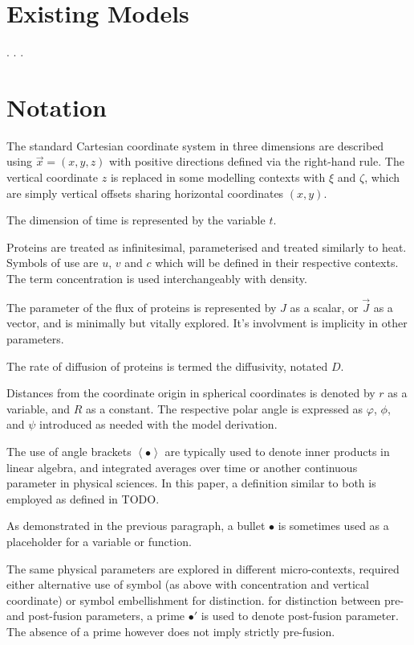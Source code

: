 \documentclass{report}
\newcommand\Angle[1]{{ \left\langle{#1}\right\rangle }}
\begin{document}
\section{Existing Models}
\cite{marrink2019computational}.
\cite{jorgensen2017computer}.
\cite{risselada2020proteins}.

\section{Notation}
The standard Cartesian coordinate system in three dimensions are described using $\vec{x} = (x, y, z)$ with positive directions defined via the right-hand rule. The vertical coordinate $z$ is replaced in some modelling contexts with $\xi$ and $\zeta$, which are simply vertical offsets sharing horizontal coordinates $(x, y)$.

The dimension of time is represented by the variable $t$.

Proteins are treated as infinitesimal, parameterised and treated similarly to heat. Symbols of use are $u$, $v$ and $c$ which will be defined in their respective contexts. The term concentration is used interchangeably with density.

The parameter of the flux of proteins is represented by $J$ as a scalar, or $\vec{J}$ as a vector, and is minimally but vitally explored. It's involvment is implicity in other parameters.

The rate of diffusion of proteins is termed the diffusivity, notated $D$.

Distances from the coordinate origin in spherical coordinates is denoted by $r$ as a variable, and $R$ as a constant. The respective polar angle is expressed as $\varphi$, $\phi$, and $\psi$ introduced as needed with the model derivation.

The use of angle brackets $\Angle{\bullet}$ are typically used to denote inner products in linear algebra, and integrated averages over time or another continuous parameter in physical sciences. In this paper, a definition similar to both is employed as defined in TODO.

As demonstrated in the previous paragraph, a bullet $\bullet$ is sometimes used as a placeholder for a variable or function.

The same physical parameters are explored in different micro-contexts, required either alternative use of symbol (as above with concentration and vertical coordinate) or symbol embellishment for distinction. for distinction between pre- and post-fusion parameters, a prime $\bullet'$ is used to denote post-fusion parameter. The absence of a prime however does not imply strictly pre-fusion.
\end{document}
